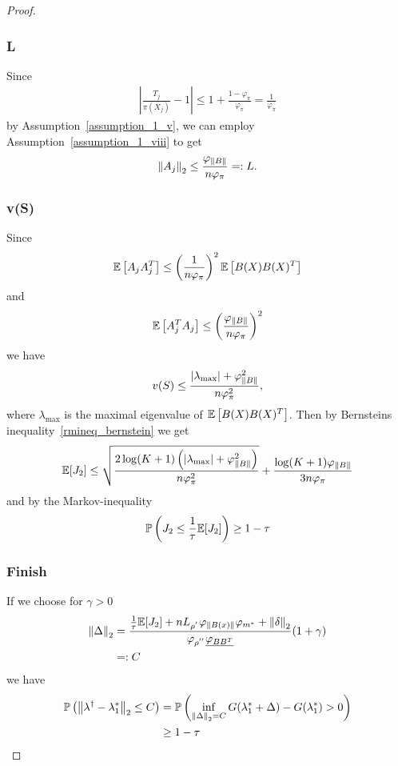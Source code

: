 \begin{proof}
\subsubsection*{L}
Since
\begin{gather}
  \left| 
      \frac{T_j}{\pi(X_j)}
      -
      1
      \right|
  \le
  1 + \frac{1 - \varphi_{\pi}}{\varphi_{\pi}}
  =
  \frac{1}{\varphi_{\pi}}
\end{gather}
by Assumption~\ref{assumption_1_v},
we can employ Assumption~\ref{assumption_1_viii}
to get
\begin{gather}
  \left\lVert A_j\right\rVert_2
  \le
  \frac{\varphi_{\left\lVert B\right\rVert}}{n \varphi_{\pi}}
  =:
  L.
\end{gather}
\subsubsection*{v(S)}
Since
\begin{gather}
  \mathbb{E}
  \left[ 
    A_j A_j^T
  \right]
  \le
  \left( 
    \frac{1}{n \varphi_{\pi}}
  \right)^2
  \mathbb{E}
  \left[ 
    B(X) B(X)^T
  \right]
\end{gather}
and
\begin{gather}
  \mathbb{E}
  \left[ 
    A_j^T A_j
  \right]
  \le
  \left( 
    \frac{\varphi_{\left\lVert B\right\rVert}}{n \varphi_{\pi}}
  \right)^2
\end{gather}
we have
\begin{gather}
  v(S)
  \le
  \frac{|\lambda_{\max} | + \varphi_{\left\lVert B\right\rVert}^2}{n \varphi_{\pi}^2},
\end{gather}
where 
$\lambda_{\max}$ is the maximal eigenvalue of
$
  \mathbb{E}
  \left[ 
    B(X) B(X)^T
  \right]
$.
Then by Bernsteins inequality~\ref{rmineq_bernstein}
we get
\begin{gather}
  \mathbb{E}[J_2]
  \le
  \sqrt{
    \frac{
    2 \log (K + 1)
    \left( 
      |\lambda_{\max} | + \varphi_{\left\lVert B\right\rVert}^2
    \right)
    }
    {
      n \varphi_{\pi}^2
    }
  }
  +
  \frac{
    \log (K + 1)
    \varphi_{\left\lVert B\right\rVert}
  }
  {
    3 n \varphi_{\pi}
  }
\end{gather}
and by the Markov-inequality
\begin{gather}
  \mathbb{P}
  \left( 
    J_2 
    \le
    \frac{1}{\tau}
    \mathbb{E}[J_2]
  \right)
  \ge 
  1 - \tau
\end{gather}
\subsubsection*{Finish}
If we choose for $\gamma > 0$
\begin{align}
  \left\lVert\Delta\right\rVert_2
  &=
  \frac{
    \frac{1}{\tau}
    \mathbb{E}[J_2]
    +
    n L_{\rho^{'}}\varphi_{\left\lVert B(x)\right\rVert} \varphi_{m^*}
    +
    \left\lVert\delta\right\rVert_2
  }
  {
   \varphi_{\rho^{''}}
  \underline{\varphi_{BB^T}}
  }
  (1 + \gamma)
  \\
  &=:
  C
\end{align}
we have
\begin{align}
  \mathbb{P}
  \left( 
      \left\lVert
        \lambda^\dagger
        -
        \lambda^*_1
      \right\rVert_2
      \le
      C 
  \right)
  &=
  \mathbb{P}
  \left( 
    \inf_{\left\lVert\Delta\right\rVert_2 = C}
    G(\lambda^*_1 + \Delta) 
    -
    G(\lambda^*_1)
    >
    0
  \right)
  \\
  &\ge
  1 - \tau
\end{align}

\end{proof}
